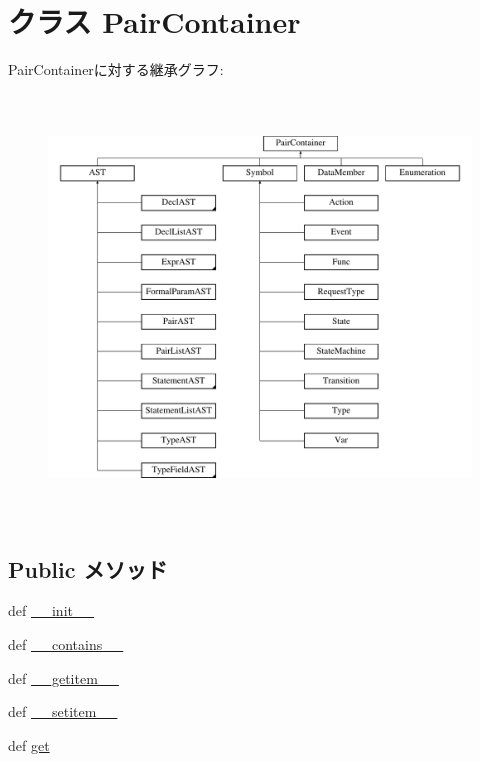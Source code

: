\hypertarget{classslicc_1_1util_1_1PairContainer}{
\section{クラス PairContainer}
\label{classslicc_1_1util_1_1PairContainer}
}
PairContainerに対する継承グラフ:\begin{figure}[H]
\begin{center}
\leavevmode
\includegraphics[height=11.2941cm]{classslicc_1_1util_1_1PairContainer}
\end{center}
\end{figure}
\subsection*{Public メソッド}
\begin{DoxyCompactItemize}
\item 
def \hyperlink{classslicc_1_1util_1_1PairContainer_ac775ee34451fdfa742b318538164070e}{\_\-\_\-init\_\-\_\-}
\item 
def \hyperlink{classslicc_1_1util_1_1PairContainer_a31ecdf34e79a47aea99a17eea32b7ac2}{\_\-\_\-contains\_\-\_\-}
\item 
def \hyperlink{classslicc_1_1util_1_1PairContainer_a50d766f4276c3d8fe330ac8cd344a75f}{\_\-\_\-getitem\_\-\_\-}
\item 
def \hyperlink{classslicc_1_1util_1_1PairContainer_a09195b01147e970ca71c48b57f653940}{\_\-\_\-setitem\_\-\_\-}
\item 
def \hyperlink{classslicc_1_1util_1_1PairContainer_a444a1328efb32d5d9d2dcb2efe855d3b}{get}
\end{DoxyCompactItemize}
